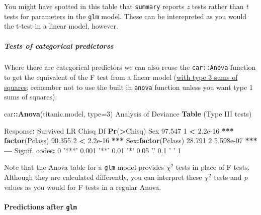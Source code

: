 \documentclass[]{article}
\newenvironment{Shaded}{\begin{snugshade}}{\end{snugshade}}
\newcommand{\DataTypeTok}[1]{\textcolor[rgb]{0.13,0.29,0.53}{#1}}
\newcommand{\DecValTok}[1]{\textcolor[rgb]{0.00,0.00,0.81}{#1}}
\newcommand{\ErrorTok}[1]{\textcolor[rgb]{0.64,0.00,0.00}{\textbf{#1}}}
\newcommand{\FloatTok}[1]{\textcolor[rgb]{0.00,0.00,0.81}{#1}}
\newcommand{\KeywordTok}[1]{\textcolor[rgb]{0.13,0.29,0.53}{\textbf{#1}}}
\newcommand{\NormalTok}[1]{#1}
\newcommand{\OperatorTok}[1]{\textcolor[rgb]{0.81,0.36,0.00}{\textbf{#1}}}
\newcommand{\StringTok}[1]{\textcolor[rgb]{0.31,0.60,0.02}{#1}}
\let\oldparagraph\paragraph
\renewcommand{\paragraph}[1]{\oldparagraph{#1}\mbox{}}
\let\oldsubparagraph\subparagraph
\renewcommand{\subparagraph}[1]{\oldsubparagraph{#1}\mbox{}}
\begin{document}
{You might have spotted in this table that \texttt{summary} reports \emph{z} tests rather
than \emph{t} tests for parameters in the \texttt{glm} model. These can be interepreted as
you would the t-test in a linear model, however.}

\hypertarget{tests-of-categorical-predictorss}{%
\subparagraph{Tests of categorical predictorss}\label{tests-of-categorical-predictorss}}

Where there are categorical predictors we can also reuse the \texttt{car::Anova}
function to get the equivalent of the F test from a linear model
(\protect\hyperlink{sums-squares}{with type 3 sums of squares}; remember not to use the built in
\texttt{anova} function unless you want type 1 sums of squares):

\begin{Shaded}
\begin{Highlighting}[]
\NormalTok{car}\OperatorTok{::}\KeywordTok{Anova}\NormalTok{(titanic.model, }\DataTypeTok{type=}\DecValTok{3}\NormalTok{)}
\NormalTok{Analysis of Deviance }\KeywordTok{Table}\NormalTok{ (Type III tests)}

\NormalTok{Response}\OperatorTok{:}\StringTok{ }\NormalTok{Survived}
\NormalTok{                   LR Chisq Df }\KeywordTok{Pr}\NormalTok{(}\OperatorTok{>}\NormalTok{Chisq)    }
\NormalTok{Sex                  }\FloatTok{97.547}  \DecValTok{1}  \OperatorTok{<}\StringTok{ }\FloatTok{2.2e-16} \OperatorTok{**}\ErrorTok{*}
\KeywordTok{factor}\NormalTok{(Pclass)       }\FloatTok{90.355}  \DecValTok{2}  \OperatorTok{<}\StringTok{ }\FloatTok{2.2e-16} \OperatorTok{**}\ErrorTok{*}
\NormalTok{Sex}\OperatorTok{:}\KeywordTok{factor}\NormalTok{(Pclass)   }\FloatTok{28.791}  \DecValTok{2}  \FloatTok{5.598e-07} \OperatorTok{**}\ErrorTok{*}
\OperatorTok{---}
\NormalTok{Signif. codes}\OperatorTok{:}\StringTok{  }\DecValTok{0} \StringTok{'***'} \FloatTok{0.001} \StringTok{'**'} \FloatTok{0.01} \StringTok{'*'} \FloatTok{0.05} \StringTok{'.'} \FloatTok{0.1} \StringTok{' '} \DecValTok{1}
\end{Highlighting}
\end{Shaded}

{Note that the Anova table for a \texttt{glm} model provides \(\chi^2\) tests in place of
F tests. Although they are calculated differently, you can interpret these
\(\chi^2\) tests and \emph{p} values as you would for F tests in a regular
Anova.}

\hypertarget{glm-predictions}{%
\paragraph{\texorpdfstring{Predictions after \texttt{glm}}{Predictions after glm}}\label{glm-predictions}}
\end{document}
